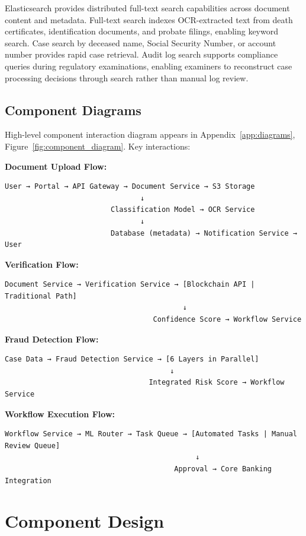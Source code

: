 Elasticsearch provides distributed full-text search capabilities across document content and metadata. Full-text search indexes OCR-extracted text from death certificates, identification documents, and probate filings, enabling keyword search. Case search by deceased name, Social Security Number, or account number provides rapid case retrieval. Audit log search supports compliance queries during regulatory examinations, enabling examiners to reconstruct case processing decisions through search rather than manual log review.

\subsection{Component Diagrams}

High-level component interaction diagram appears in Appendix~\ref{app:diagrams}, Figure~\ref{fig:component_diagram}. Key interactions:

\textbf{Document Upload Flow:}
\begin{verbatim}
User → Portal → API Gateway → Document Service → S3 Storage
                                ↓
                         Classification Model → OCR Service
                                ↓
                         Database (metadata) → Notification Service → User
\end{verbatim}

\textbf{Verification Flow:}
\begin{verbatim}
Document Service → Verification Service → [Blockchain API | Traditional Path]
                                          ↓
                                   Confidence Score → Workflow Service
\end{verbatim}

\textbf{Fraud Detection Flow:}
\begin{verbatim}
Case Data → Fraud Detection Service → [6 Layers in Parallel]
                                       ↓
                                  Integrated Risk Score → Workflow Service
\end{verbatim}

\textbf{Workflow Execution Flow:}
\begin{verbatim}
Workflow Service → ML Router → Task Queue → [Automated Tasks | Manual Review Queue]
                                             ↓
                                        Approval → Core Banking Integration
\end{verbatim}

\section{Component Design}\label{sec:component_design}

